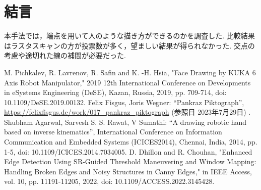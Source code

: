 \documentclass[10pt]{jarticle}
\begin{document}
	\section{結\hspace{2zw}言}%
	本手法では，端点を用いて人のような描き方ができるのかを調査した.
	比較結果はラスタスキャンの方が投票数が多く，望ましい結果が得られなかった. 
	交点の考慮や途切れた線の補間が必要だった. 
    
    \vspace{5truemm}
    {\footnotesize
        \begin{thebibliography}{99}
            M. Pichkalev, R. Lavrenov, R. Safin and K. -H. Hsia, "Face Drawing by KUKA 6 Axis Robot Manipulator," 2019 12th International Conference on Developments in eSystems Engineering (DeSE), Kazan, Russia, 2019, pp. 709-714, doi: 10.1109/DeSE.2019.00132.
            Felix Fisgus, Joris Wegner: ``Pankraz Piktograph'', 
            \url{https://felixfisgus.de/work/017\_pankraz\_piktograph}
            (参照日 2023年7月29日) .
            Shubham Agarwal, Sarvesh S. S. Rawat, V Sumathi: ``A drawing robotic hand based on inverse kinematics'', 
            International Conference on Information Communication and Embedded Systems (ICICES2014), Chennai, India, 2014, pp. 1-5, doi: 10.1109/ICICES.2014.7034005.
		   D. Dhillon and R. Chouhan, "Enhanced Edge Detection Using SR-Guided Threshold Maneuvering and Window Mapping: Handling Broken Edges and Noisy Structures in Canny Edges," in IEEE Access, vol. 10, pp. 11191-11205, 2022, doi: 10.1109/ACCESS.2022.3145428.
            
        \end{thebibliography}
    }
    \normalsize
    
\end{document}
